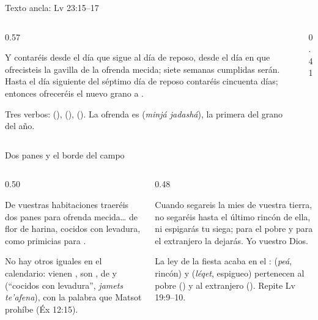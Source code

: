 \begin{frame}{Texto ancla: Lv 23:15--17}
\begin{columns}[c,onlytextwidth]
\begin{column}{0.57\textwidth}
\begin{cita}Y contaréis desde el día que sigue al día de reposo, desde el día en que ofrecisteis la gavilla de la ofrenda mecida; siete semanas cumplidas serán. Hasta el día siguiente del séptimo día de reposo contaréis cincuenta días; entonces ofreceréis el nuevo grano a \SENOR.\end{cita}
\small Tres verbos:  (),  (),  (). La ofrenda es  (\emph{minjá jadashá}), la primera del grano del año.
\end{column}
\begin{column}{0.41\textwidth}\end{column}
\end{columns}
\end{frame}

\begin{frame}{Dos panes y el borde del campo}
\begin{columns}[t,onlytextwidth]
\begin{column}{0.50\textwidth}
\centering{}\par
\begin{cita}De vuestras habitaciones traeréis dos panes para ofrenda mecida\ldots{} de flor de harina, cocidos con levadura, como primicias para \SENOR.\end{cita}
\scriptsize\RaggedRight No hay otros iguales en el calendario: vienen , son , de  y  (``cocidos con levadura'', \emph{jamets te'afena}), con la palabra que Matsot prohíbe (Éx 12:15).
\end{column}
\begin{column}{0.48\textwidth}
\begin{cita}Cuando segareis la mies de vuestra tierra, no segaréis hasta el último rincón de ella, ni espigarás tu siega; para el pobre y para el extranjero la dejarás. Yo \SENOR{} vuestro Dios.\end{cita}
\scriptsize\RaggedRight La ley de la fiesta acaba en el :  (\emph{peá}, rincón) y  (\emph{léqet}, espigueo) pertenecen al pobre () y al extranjero (). Repite Lv 19:9--10.
\end{column}
\end{columns}
\end{frame}

